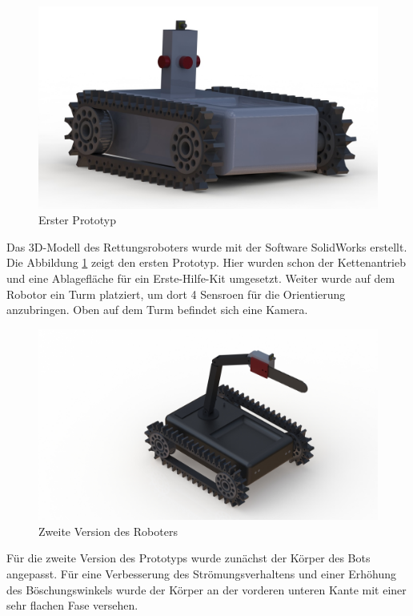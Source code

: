 \begin{figure}[h]
    \centering
    \captionsetup{width=.9\linewidth}
    \includegraphics[width=1\linewidth]{v2_rendering.JPG}
    \caption{Erster Prototyp}
    \label{fig:prot}
\end{figure}

Das 3D-Modell des Rettungsroboters wurde mit der Software SolidWorks erstellt. Die Abbildung \ref{fig:prot} zeigt den ersten Prototyp. Hier wurden schon der Kettenantrieb und eine Ablagefläche für ein Erste-Hilfe-Kit umgesetzt. Weiter wurde auf dem Robotor ein Turm platziert, um dort 4 Sensroen für die Orientierung anzubringen. Oben auf dem Turm befindet sich eine Kamera.\\


\begin{figure}[h]
    \centering
    \captionsetup{width=.9\linewidth}
    \includegraphics[width=1\linewidth]{bot_rendering_v4.JPG}
    \caption{Zweite Version des Roboters}
    \label{fig:second}
\end{figure}

Für die zweite Version des Prototyps wurde zunächst der Körper des Bots angepasst. Für eine Verbesserung des Strömungsverhaltens und einer Erhöhung des Böschungswinkels wurde der Körper an der vorderen unteren Kante mit einer sehr flachen Fase versehen.

